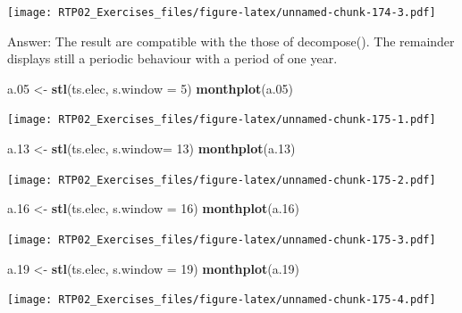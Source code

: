 \documentclass[
]{article}
\newenvironment{Shaded}{\begin{snugshade}}{\end{snugshade}}
\newcommand{\DataTypeTok}[1]{\textcolor[rgb]{0.13,0.29,0.53}{#1}}
\newcommand{\DecValTok}[1]{\textcolor[rgb]{0.00,0.00,0.81}{#1}}
\newcommand{\FloatTok}[1]{\textcolor[rgb]{0.00,0.00,0.81}{#1}}
\newcommand{\KeywordTok}[1]{\textcolor[rgb]{0.13,0.29,0.53}{\textbf{#1}}}
\newcommand{\NormalTok}[1]{#1}
\newcommand{\StringTok}[1]{\textcolor[rgb]{0.31,0.60,0.02}{#1}}
\begin{document}
\texttt{[image: RTP02\_Exercises\_files/figure-latex/unnamed-chunk-174-3.pdf]}

Answer: The result are compatible with the those of decompose(). The
remainder displays still a periodic behaviour with a period of one year.

\begin{Shaded}
\begin{Highlighting}[]
\NormalTok{a}\FloatTok{.05}\NormalTok{ <-}\StringTok{ }\KeywordTok{stl}\NormalTok{(ts.elec, }\DataTypeTok{s.window =} \DecValTok{5}\NormalTok{)}
\KeywordTok{monthplot}\NormalTok{(a}\FloatTok{.05}\NormalTok{)}
\end{Highlighting}
\end{Shaded}

\texttt{[image: RTP02\_Exercises\_files/figure-latex/unnamed-chunk-175-1.pdf]}

\begin{Shaded}
\begin{Highlighting}[]
\NormalTok{a}\FloatTok{.13}\NormalTok{ <-}\StringTok{ }\KeywordTok{stl}\NormalTok{(ts.elec, }\DataTypeTok{s.window=} \DecValTok{13}\NormalTok{)}
\KeywordTok{monthplot}\NormalTok{(a}\FloatTok{.13}\NormalTok{)}
\end{Highlighting}
\end{Shaded}

\texttt{[image: RTP02\_Exercises\_files/figure-latex/unnamed-chunk-175-2.pdf]}

\begin{Shaded}
\begin{Highlighting}[]
\NormalTok{a}\FloatTok{.16}\NormalTok{ <-}\StringTok{ }\KeywordTok{stl}\NormalTok{(ts.elec, }\DataTypeTok{s.window =} \DecValTok{16}\NormalTok{)}
\KeywordTok{monthplot}\NormalTok{(a}\FloatTok{.16}\NormalTok{)}
\end{Highlighting}
\end{Shaded}

\texttt{[image: RTP02\_Exercises\_files/figure-latex/unnamed-chunk-175-3.pdf]}

\begin{Shaded}
\begin{Highlighting}[]
\NormalTok{a}\FloatTok{.19}\NormalTok{ <-}\StringTok{ }\KeywordTok{stl}\NormalTok{(ts.elec, }\DataTypeTok{s.window =} \DecValTok{19}\NormalTok{)}
\KeywordTok{monthplot}\NormalTok{(a}\FloatTok{.19}\NormalTok{)}
\end{Highlighting}
\end{Shaded}

\texttt{[image: RTP02\_Exercises\_files/figure-latex/unnamed-chunk-175-4.pdf]}
\end{document}
